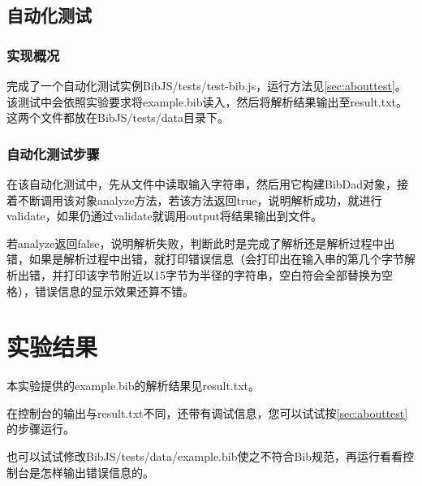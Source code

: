 \documentclass[a4paper]{article}
\begin{document}
\begin{CJK*}{UTF8}{gbsn}
    \subsection{自动化测试}
    \subsubsection{实现概况}
    完成了一个自动化测试实例BibJS/tests/test-bib.js，运行方法见\ref{sec:abouttest}。该测试中会依照实验要求将example.bib读入，然后将解析结果输出至result.txt。这两个文件都放在BibJS/tests/data目录下。

    \subsubsection{自动化测试步骤}
    在该自动化测试中，先从文件中读取输入字符串，然后用它构建BibDad对象，接着不断调用该对象analyze方法，若该方法返回true，说明解析成功，就进行validate，如果仍通过validate就调用output将结果输出到文件。
    \par 若analyze返回false，说明解析失败，判断此时是完成了解析还是解析过程中出错，如果是解析过程中出错，就打印错误信息（会打印出在输入串的第几个字节解析出错，并打印该字节附近以15字节为半径的字符串，空白符会全部替换为空格），错误信息的显示效果还算不错。

    \section{实验结果}
    本实验提供的example.bib的解析结果见result.txt。
    \par 在控制台的输出与result.txt不同，还带有调试信息，您可以试试按\ref{sec:abouttest}的步骤运行。
    \par 也可以试试修改BibJS/tests/data/example.bib使之不符合Bib规范，再运行看看控制台是怎样输出错误信息的。

\clearpage
\end{CJK*}
\end{document}
